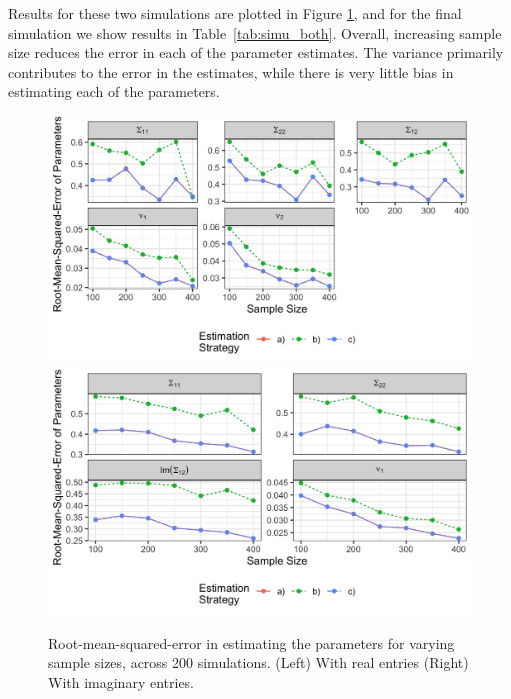 \documentclass[11pt]{article}
\begin{document}
Results for these two simulations are plotted in Figure \ref{fig:simu}, and for the final simulation we show results in Table~\ref{tab:simu_both}. Overall, increasing sample size reduces the error in each of the parameter estimates. The variance primarily contributes to the error in the estimates, while there is very little bias in estimating each of the parameters.

\begin{figure}[h]
\centering
\includegraphics[scale=.11]{../simulation_plot_real.png}
\includegraphics[scale=.11]{../simulation_plot_imaginary.png}
\caption{Root-mean-squared-error in estimating the parameters for varying sample sizes, across 200 simulations. (Left) With real entries (Right) With imaginary entries.}\label{fig:simu}
\end{figure}
\end{document}
